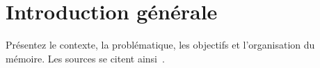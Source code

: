 \chapter*{Introduction générale}

Présentez le contexte, la problématique, les objectifs et l'organisation du mémoire.
Les sources se citent ainsi~\cite{lamport1994}.

